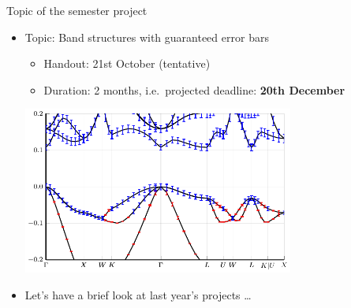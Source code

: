 \begin{frame}{Topic of the semester project}
    \begin{itemize}
        \item Topic: \alert{Band structures with guaranteed error bars}
            \begin{itemize}
                \vspace{-0.5em}
                \item Handout: 21st October \textcolor{grey5}{(tentative)}
                \vspace{-0.5em}
                \item Duration: 2 months, i.e.~projected deadline: \textbf{20th December}
            \end{itemize}
        \vspace{1.5em}
        \begin{center}
        \includegraphics[width=0.7\textwidth]{img/si_band_errors.pdf}
        \end{center}
        \vspace{0.5em}
        \item Let's have a brief look at last year's projects \ldots
    \end{itemize}
\end{frame}

